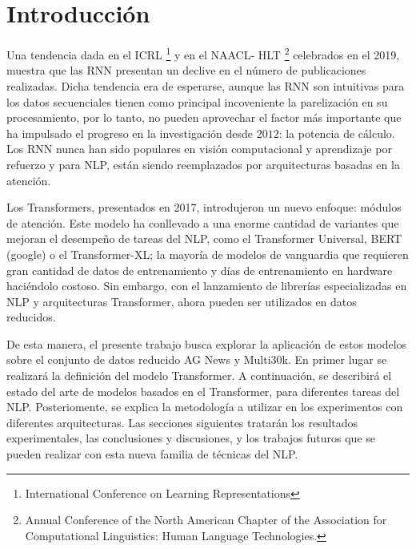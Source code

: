 \documentclass[conference]{IEEEtran}
\begin{document}
\section{Introducci\'on}
Una tendencia dada en el ICRL \footnote{International Conference on Learning Representations } y en el NAACL- HLT \footnote{Annual Conference of the North American Chapter of the Association for Computational Linguistics: Human Language Technologies.} celebrados en el 2019,  muestra que las RNN presentan un declive en el n\'umero de publicaciones realizadas. Dicha tendencia era de esperarse, aunque las RNN son intuitivas para los datos secuenciales tienen como principal incoveniente la parelización en su procesamiento, por lo tanto, no pueden aprovechar el factor m\'as importante que ha impulsado el progreso en la investigaci\'on desde $2012$: la potencia de c\'alculo. Los RNN nunca han sido populares en visi\'on computacional y aprendizaje por refuerzo y para NLP, est\'an siendo reemplazados por arquitecturas basadas en la atenci\'on.

\vspace{0.2cm}

Los Transformers, presentados en 2017, introdujeron un nuevo enfoque: m\'odulos de atenci\'on. Este modelo ha conllevado a una enorme cantidad de variantes que mejoran el desempe\~no de tareas del NLP, como el Transformer Universal, BERT (google) o el Transformer-XL; la mayor\'ia de modelos de vanguardia que requieren gran cantidad de datos de entrenamiento y d\'ias de entrenamiento en hardware haci\'endolo costoso. Sin embargo, con el lanzamiento de librer\'ias especializadas en NLP y arquitecturas Transformer, ahora pueden ser utilizados en datos reducidos.

\vspace{0.2cm}

De esta manera, el presente trabajo busca explorar la aplicación de estos modelos sobre el conjunto de datos reducido AG News y Multi30k. En primer lugar se realizar\'a la definici\'on del modelo Transformer. A continuaci\'on, se describir\'a el estado del arte de modelos basados en el Transformer, para diferentes tareas del NLP. Posteriomente, se explica la metodolog\'ia a utilizar en los experimentos con diferentes arquitecturas. Las secciones siguientes tratar\'an los resultados experimentales, las conclusiones y discusiones, y los trabajos futuros que se pueden realizar con esta nueva familia de t\'ecnicas del NLP.

\vspace{0.2cm}
\end{document}
